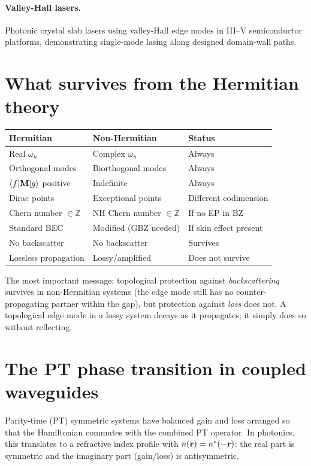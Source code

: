 \paragraph{Valley-Hall lasers.}
Photonic crystal slab lasers using valley-Hall edge modes in III--V
semiconductor platforms, demonstrating single-mode lasing along
designed domain-wall paths.

\section{What survives from the Hermitian theory}
\label{sec:ch17-survives}

\begin{center}
\begin{tabular}{lll}
  \toprule
  \textbf{Hermitian} & \textbf{Non-Hermitian} & \textbf{Status} \\
  \midrule
  Real $\omega_n$ & Complex $\omega_n$ & Always \\
  Orthogonal modes & Biorthogonal modes & Always \\
  $\langle f|\mathbf{M}|g\rangle$ positive & Indefinite & Always \\
  Dirac points & Exceptional points & Different codimension \\
  Chern number $\in\mathbb{Z}$ & NH Chern number $\in\mathbb{Z}$
    & If no EP in BZ \\
  Standard BEC & Modified (GBZ needed) & If skin effect present \\
  No backscatter & No backscatter & Survives \\
  Lossless propagation & Lossy/amplified & Does not survive \\
  \bottomrule
\end{tabular}
\end{center}

The most important message: topological protection against
\emph{backscattering} survives in non-Hermitian systems (the edge mode
still has no counter-propagating partner within the gap), but protection
against \emph{loss} does not.  A topological edge mode in a lossy
system decays as it propagates; it simply does so without reflecting.

\section{The PT phase transition in coupled waveguides}
\label{sec:ch17-pt-lattices-experiment}

Parity-time (PT) symmetric systems have balanced gain and loss
arranged so that the Hamiltonian commutes with the combined PT
operator.  In photonics, this translates to a refractive index profile
with $n(\mathbf{r})=n^*(-\mathbf{r})$: the real part is symmetric and the
imaginary part (gain/loss) is antisymmetric.

